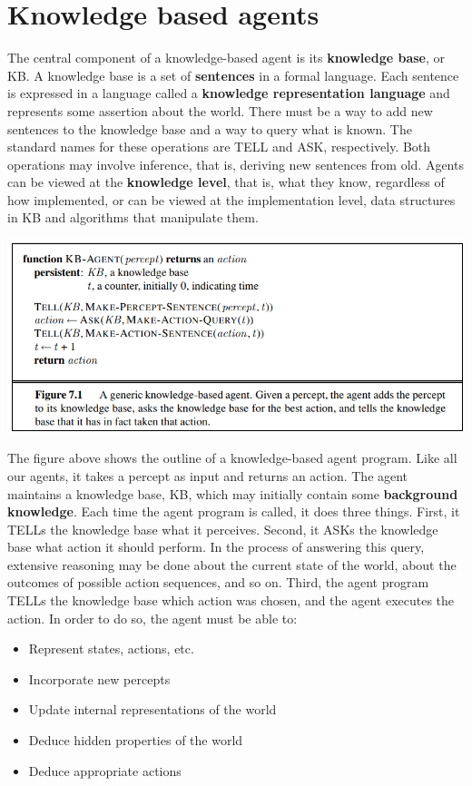 \section{Knowledge based agents}
The central component of a knowledge-based agent is its \textbf{knowledge base}, or KB. A knowledge base is a set of \textbf{sentences} in a formal language. Each sentence is expressed in a language called a \textbf{knowledge representation language} and represents some assertion about the world.\newline\newline
There must be a way to add new sentences to the knowledge base and a way to query what is known. The standard names for these operations are TELL and ASK, respectively. Both operations may involve inference, that is, deriving new sentences from old.\newline\newline
Agents can be viewed at the \textbf{knowledge level}, that is, what they know, regardless of how implemented, or can be viewed  at the implementation level, data structures in KB and algorithms that manipulate them.
\begin{center}
    \includegraphics[]{images/KB-agents.png}
\end{center}
The figure above shows the outline of a knowledge-based agent program. Like all our agents, it takes a percept as input and returns an action. The agent maintains a knowledge base, KB, which may initially contain some \textbf{background knowledge}.\newline\newline
Each time the agent program is called, it does three things. First, it TELLs the knowledge base what it perceives. Second, it ASKs the knowledge base what action it should perform. In the process of answering this query, extensive reasoning may be done about the current state of the world, about the outcomes of possible action sequences, and so on.
Third, the agent program TELLs the knowledge base which action was chosen, and the agent executes the action. In order to do so, the agent must be able to:
\begin{itemize}
    \item Represent states, actions, etc.
    \item Incorporate new percepts
    \item Update internal representations of the world
    \item Deduce hidden properties of the world
    \item Deduce appropriate actions
\end{itemize}

